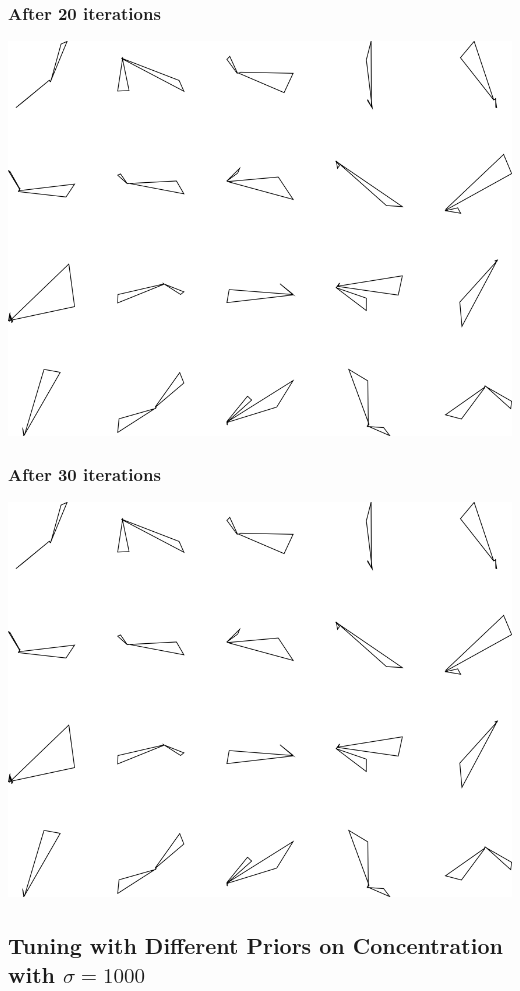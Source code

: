 \subsubsection{After 20 iterations}

\includegraphics[width=6in]{output/3.learning/concentration/concentration_psw1_iter20_.png}
\subsubsection{After 30 iterations}

\includegraphics[width=6in]{output/3.learning/concentration/concentration_psw1_iter30_.png}
\subsection{Tuning with Different Priors on Concentration with $\sigma=1000$}

